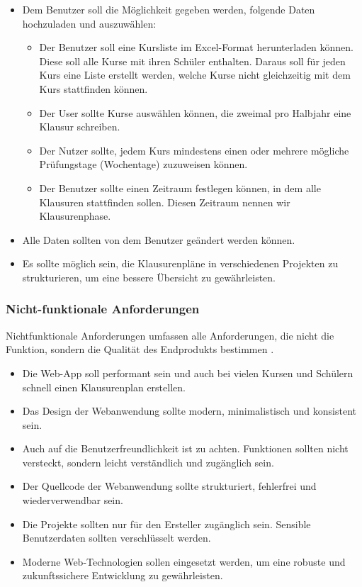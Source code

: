 \begin{itemize}
    \item Dem Benutzer soll die Möglichkeit gegeben werden, folgende Daten hochzuladen und auszuwählen:
    
    \begin{itemize}
        \item Der Benutzer soll eine Kursliste im Excel-Format herunterladen können. Diese soll alle Kurse mit ihren Schüler enthalten. Daraus soll für jeden Kurs eine Liste erstellt werden, welche Kurse nicht gleichzeitig mit dem Kurs stattfinden können.
        
        \item Der User sollte Kurse auswählen können, die zweimal pro Halbjahr eine Klausur schreiben.
        
        \item Der Nutzer sollte, jedem Kurs mindestens einen oder mehrere mögliche Prüfungstage (Wochentage) zuzuweisen können.
        
        \item Der Benutzer sollte einen Zeitraum festlegen können, in dem alle Klausuren stattfinden sollen. Diesen Zeitraum nennen wir Klausurenphase.
    \end{itemize}
    
    \item Alle Daten sollten von dem Benutzer geändert werden können. 
    
    \item Es sollte möglich sein, die Klausurenpläne in verschiedenen Projekten zu strukturieren, um eine bessere Übersicht zu gewährleisten. 
\end{itemize}
\subsubsection{Nicht-funktionale Anforderungen}
Nichtfunktionale Anforderungen umfassen alle Anforderungen, die nicht die Funktion, sondern die Qualität des Endprodukts bestimmen \parencite{anforderungen}.
\begin{itemize}
    \item Die Web-App soll performant sein und auch bei vielen Kursen und Schülern schnell einen Klausurenplan erstellen.
    \item Das Design der Webanwendung sollte modern, minimalistisch und konsistent sein.
    \item Auch auf die Benutzerfreundlichkeit ist zu achten. Funktionen sollten nicht versteckt, sondern leicht verständlich und zugänglich sein.
    \item Der Quellcode der Webanwendung sollte strukturiert, fehlerfrei und wiederverwendbar sein.
    \item Die Projekte sollten nur für den Ersteller zugänglich sein. Sensible Benutzerdaten sollten verschlüsselt werden.
    \item Moderne Web-Technologien sollen eingesetzt werden, um eine robuste und zukunftssichere Entwicklung zu gewährleisten.
\end{itemize}

